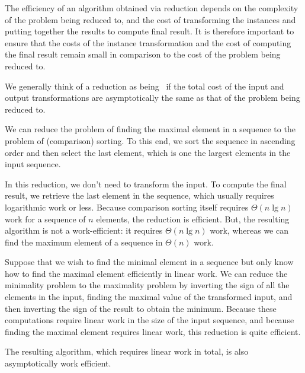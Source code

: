 \begin{gram}
\label{gr:design::reduction::efficiency}

The efficiency of an algorithm obtained via reduction depends on the
complexity of the problem being reduced to, and the cost of
transforming the instances and putting together the results to compute
final result.
%
It is therefore important to ensure that the costs of the instance
transformation and the cost of computing the final result remain small in
comparison to the cost of the problem being reduced to.

We generally think of a reduction as being~ if the
total cost of the input and output transformations are asymptotically
the same as that of the problem being reduced to.
%
\end{gram}

\begin{example}
  We can reduce the problem of finding the maximal element in a
  sequence to the problem of (comparison) sorting.
%
To this end, we sort the sequence in ascending order and then select
the last element, which is one the largest elements in the input
sequence.  
%

In this reduction, we don't need to transform the input.
%
To compute the final result, we retrieve the last element in the
sequence, which usually requires logarithmic work or less.
%
Because comparison sorting itself requires $\Theta(n\lg{n})$ work for
a sequence of $n$ elements, the reduction is efficient.
%
But, the resulting algorithm is not a work-efficient: it requires
$\Theta(n\lg{n})$ work, whereas we can find the maximum element of a
sequence in $\Theta(n)$ work.
\end{example}

\begin{example}
Suppose that we wish to find the minimal element in a sequence but
only know how to find the maximal element efficiently in linear work.
%
We can reduce the minimality problem to the maximality problem by
inverting the sign of all the elements in the input, finding the
maximal value of the transformed input, and then inverting the sign of
the result to obtain the minimum.
%
Because these computations require linear work in the size of the
input sequence, and because finding the maximal element requires
linear work, this reduction is quite efficient.
%

The resulting algorithm, which requires linear work in total, is also
asymptotically work efficient.
\end{example}


